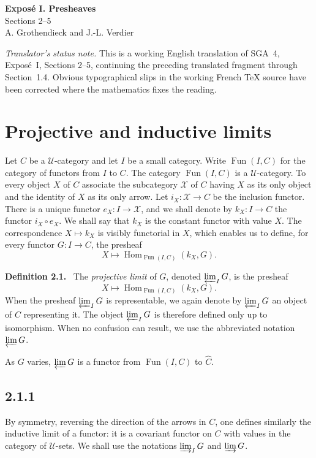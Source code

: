 \documentclass[11pt]{article}
\newcommand{\U}{\mathcal{U}}
\newcommand{\Xcal}{\mathcal{X}}
\newcommand{\Hom}{\operatorname{Hom}}
\newcommand{\Fun}{\operatorname{Fun}}
\newenvironment{statement}[1]{\par\medskip\noindent\textbf{#1.}\ }{\par\medskip}
\begin{document}
\begin{center}
{\Large \textbf{Expos\'e I. Presheaves}}\\[0.35em]
{\large Sections 2--5}\\[0.35em]
A. Grothendieck and J.-L. Verdier
\end{center}

\bigskip

\noindent\emph{Translator's status note.} This is a working English translation of SGA~4, Expos\'e~I, Sections 2--5, continuing the preceding translated fragment through Section~1.4. Obvious typographical slips in the working French \TeX{} source have been corrected where the mathematics fixes the reading.

\setcounter{section}{1}
\section{Projective and inductive limits}

Let $C$ be a $\U$-category and let $I$ be a small category. Write $\Fun(I,C)$ for the category of functors from $I$ to $C$. The category $\Fun(I,C)$ is a $\U$-category. To every object $X$ of $C$ associate the subcategory $\Xcal$ of $C$ having $X$ as its only object and the identity of $X$ as its only arrow. Let $i_X:\Xcal\to C$ be the inclusion functor. There is a unique functor $e_X:I\to \Xcal$, and we shall denote by $k_X:I\to C$ the functor $i_X\circ e_X$. We shall say that $k_X$ is the constant functor with value $X$. The correspondence $X\mapsto k_X$ is visibly functorial in $X$, which enables us to define, for every functor $G:I\to C$, the presheaf
\[
X\longmapsto \Hom_{\Fun(I,C)}(k_X,G).
\]

\begin{statement}{Definition 2.1}
The \emph{projective limit} of $G$, denoted $\varprojlim_I G$, is the presheaf
\[
X\longmapsto \Hom_{\Fun(I,C)}(k_X,G).
\]
When the presheaf $\varprojlim_I G$ is representable, we again denote by $\varprojlim_I G$ an object of $C$ representing it. The object $\varprojlim_I G$ is therefore defined only up to isomorphism. When no confusion can result, we use the abbreviated notation $\varprojlim G$.
\end{statement}

As $G$ varies, $\varprojlim G$ is a functor from $\Fun(I,C)$ to $\widehat C$.

\subsection*{2.1.1}
By symmetry, reversing the direction of the arrows in $C$, one defines similarly the inductive limit of a functor: it is a covariant functor on $C$ with values in the category of $\U$-sets. We shall use the notations $\varinjlim_I G$ and $\varinjlim G$.
\end{document}
